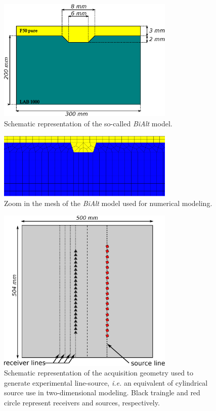 \documentclass[manuscript,revised]{geophysics}
\newcommand{\bialt}{\textit{BiAlt} }
\begin{document}
\begin{figure}[!h]
	\centering
	\includegraphics[width=0.75\textwidth]{fig/bialt_model.eps}
	\caption{Schematic representation of the so-called \bialt model.}
	\label{panel_bialt_model}
\end{figure}

\begin{figure}[!h]
	\centering
	\includegraphics[width=0.75\textwidth]{fig/bialt-mesh.eps}
	\caption{Zoom in the mesh of the \bialt model used for numerical modeling.}
	\label{panel_bialt_mesh}
\end{figure}

\begin{figure}[!h]
	\centering
	\includegraphics[width=0.75\textwidth]{fig/amplitude_acqui_principle.eps}
	\caption{Schematic representation of the acquisition geometry used to generate experimental line-source, \textit{i.e.} an equivalent of cylindrical source use in two-dimensional modeling. Black traingle and red circle represent receivers and sources, respectively.}
	\label{amplitude_acqui_principle}
\end{figure}
\end{document}
